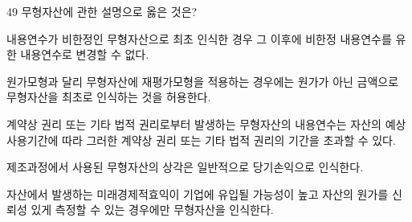 \begin{question}{49}
무형자산에 관한 설명으로 옳은 것은?
\begin{choices}
  \item 내용연수가 비한정인 무형자산으로 최초 인식한 경우 그 이후에 비한정 내용연수를 유한 내용연수로 변경할 수 없다.
  \item 원가모형과 달리 무형자산에 재평가모형을 적용하는 경우에는 원가가 아닌 금액으로 무형자산을 최초로 인식하는 것을 허용한다.
  \item 계약상 권리 또는 기타 법적 권리로부터 발생하는 무형자산의 내용연수는 자산의 예상 사용기간에 따라 그러한 계약상 권리 또는 기타 법적 권리의 기간을 초과할 수 있다.
  \item 제조과정에서 사용된 무형자산의 상각은 일반적으로 당기손익으로 인식한다.
  \item 자산에서 발생하는 미래경제적효익이 기업에 유입될 가능성이 높고 자산의 원가를 신뢰성 있게 측정할 수 있는 경우에만 무형자산을 인식한다.
\end{choices}
\end{question}
